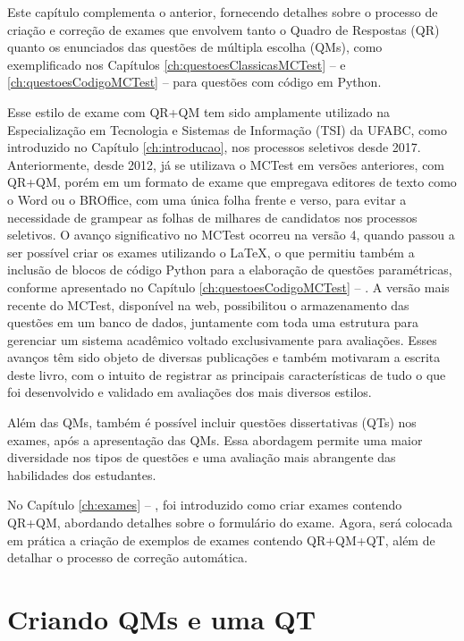 \label{ch:examesQM_QT}

Este capítulo complementa o anterior, fornecendo detalhes sobre o processo de criação e correção de exames que envolvem tanto o Quadro de Respostas (QR) quanto os enunciados das questões de múltipla escolha (QMs), como exemplificado nos Capítulos \ref{ch:questoesClassicasMCTest} --  e  \ref{ch:questoesCodigoMCTest} --  para questões com código em Python.

Esse estilo de exame com QR+QM tem sido amplamente utilizado na Especialização em Tecnologia e Sistemas de Informação (TSI) da UFABC, como introduzido no Capítulo \ref{ch:introducao}, nos processos seletivos desde 2017. Anteriormente, desde 2012, já se utilizava o MCTest em versões anteriores, com QR+QM, porém em um formato de exame que empregava editores de texto como o Word ou o BROffice, com uma única folha frente e verso, para evitar a necessidade de grampear as folhas de milhares de candidatos nos processos seletivos. O avanço significativo no MCTest ocorreu na versão 4, quando passou a ser possível criar os exames utilizando o \LaTeX{}, o que permitiu também a inclusão de blocos de código Python para a elaboração de questões paramétricas, conforme apresentado no Capítulo \ref{ch:questoesCodigoMCTest} -- . A versão mais recente do MCTest, disponível na web, possibilitou o armazenamento das questões em um banco de dados, juntamente com toda uma estrutura para gerenciar um sistema acadêmico voltado exclusivamente para avaliações. Esses avanços têm sido objeto de diversas publicações e também motivaram a escrita deste livro, com o intuito de registrar as principais características de tudo o que foi desenvolvido e validado em avaliações dos mais diversos estilos.

Além das QMs, também é possível incluir questões dissertativas (QTs) nos exames, após a apresentação das QMs. Essa abordagem permite uma maior diversidade nos tipos de questões e uma avaliação mais abrangente das habilidades dos estudantes.

No Capítulo \ref{ch:exames} -- , foi introduzido como criar exames contendo QR+QM, abordando detalhes sobre o formulário do exame. Agora, será colocada em prática a criação de exemplos de exames contendo QR+QM+QT, além de detalhar o processo de correção automática.

\section{Criando QMs e uma QT}\label{sec:questoesQM_QT}

